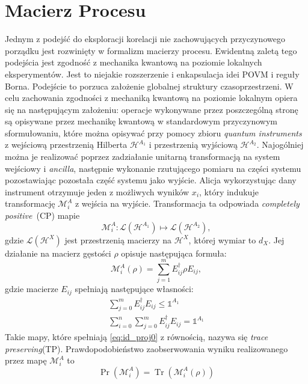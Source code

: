 \documentclass[10pt]{article} %
\DeclareMathOperator{\Trs}{Tr}
\newcommand{\Mats}[1]{\mathcal{L}(#1)}
\newcommand{\Hx}[1]{\mathcal{H}^{#1}}
\newcommand{\LHx}[1]{\Mats{\Hx{#1}}}
\newcommand{\MXi}[3]{\mathcal{M}^{#1}_{#2}(#3)}
\newcommand{\MXin}[2]{\mathcal{M}^{#1}_{#2}}
\newcommand{\MAin}[0]{\MXin{A}{i}}
\newcommand{\MAi}[1]{\MXi{A}{i}{#1}}
\newcommand{\MAir}{\MAi{\rho}}
\newcommand{\Idx}[1]{\mathbb{1}^{#1}}
\newcommand{\Tr}[1]{\Trs(#1)}
\newcommand{\Pro}[1]{\Pr(#1)}
\newcommand{\CP}{\textit{completely positive}}
\newcommand{\TP}{\textit{trace preserving}}
\begin{document}
\section{Macierz Procesu}
\label{macierz_procesu}
Jednym z podejść do eksploracji korelacji nie zachowujących przyczynowego porządku jest rozwinięty w \cite{process_matrix} formalizm macierzy procesu.
Ewidentną zaletą tego podejścia jest zgodność z mechanika kwantową na poziomie lokalnych eksperymentów. Jest to niejakie rozszerzenie i enkapsulacja idei POVM i reguły Borna. Podejście to porzuca założenie globalnej struktury czasoprzestrzeni. W celu zachowania zgodności z mechaniką kwantową na poziomie lokalnym opiera się na następującym założeniu: operacje wykonywane przez poszczególną stronę są opisywane przez mechanikę kwantową w standardowym przyczynowym sformułowaniu, które można opisywać przy pomocy zbioru \textit{quantum instruments} \cite{quantum_instrument} z wejściową przestrzenią Hilberta $\mathcal{H}^{A_1}$ i przestrzenią wyjściową  $\mathcal{H}^{A_2}$. Najogólniej można je realizować poprzez zadziałanie unitarną transformacją na system wejściowy i \textit{ancilla}, następnie wykonanie rzutującego pomiaru na części systemu pozostawiając pozostała część systemu jako wyjście. Alicja wykorzystując dany instrument otrzymuje jeden z możliwych wyników $x_i$, który indukuje transformację $\mathcal{M}^A_i$ z wejścia na wyjście. Transformacja ta odpowiada \CP~(CP) mapie
\begin{equation}
\mathcal{M}^A_i : \mathcal{L}(\mathcal{H}^{A_1}) \mapsto \mathcal{L}(\mathcal{H}^{A_2}),
\end{equation}
gdzie $\LHx{X}$ jest przestrzenią macierzy na $\Hx{X}$, której wymiar to $d_X$. Jej działanie na macierz gęstości $\rho$ opisuje następująca formuła:
\begin{equation}
\label{yolo}
\MAi{\rho} = \sum^m_{j=1} E_{ij} ^\dag \rho E_{ij},
\end{equation}
gdzie macierze $E_{ij}$ spełniają następujące własności:
\begin{gather}
\label{eq:id_proj0} 
\sum^m_{j=0} E_{ij}^\dag E_{ij} \leq \Idx{A_1} \\
\label{eq:id_proj} 
\sum^n_{i=0} \sum^m_{j=0} E_{ij}^\dag E_{ij} = \Idx{A_1}
\end{gather}
Takie mapy, które spełniają \eqref{eq:id_proj0} z równością, nazywa się \TP (TP).
Prawdopodobieństwo zaobserwowania wyniku realizowanego przez mapę $\MAin$ to
\begin{equation}
\Pro{\MAin} = \Tr{\MAir}
\end{equation}
\end{document}
